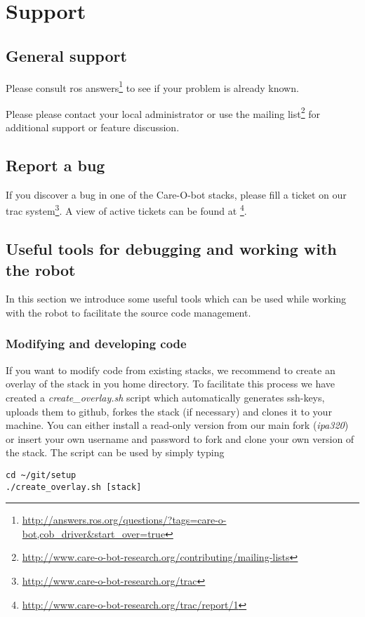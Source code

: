 \chapter{Support}\label{chap:support}
\section{General support}
Please consult ros answers\footnote{\url{http://answers.ros.org/questions/?tags=care-o-bot,cob_driver&start_over=true}} to see if your problem is already known. 

Please please contact your local administrator or use the mailing list\footnote{\url{http://www.care-o-bot-research.org/contributing/mailing-lists}} for additional support or feature discussion.

\section{Report a bug}
If you discover a bug in one of the Care-O-bot stacks, please fill a ticket on our trac system\footnote{\url{http://www.care-o-bot-research.org/trac}}. A view of active tickets can be found at \footnote{\url{http://www.care-o-bot-research.org/trac/report/1}}.


\section{Useful tools for debugging and working with the robot}
In this section we introduce some useful tools which can be used while working with the robot to facilitate the source code management.

\subsection{Modifying and developing code}
If you want to modify code from existing stacks, we recommend to create an overlay of the stack in you home directory. To facilitate this process we have created a \textit{create\_overlay.sh} script which automatically generates ssh-keys, uploads them to github, forkes the stack (if necessary) and clones it to your machine. You can either install a read-only version from our main fork (\textit{ipa320}) or insert your own username and password to fork and clone your own version of the stack. The script can be used by simply typing
\begin{lstlisting}
cd ~/git/setup
./create_overlay.sh [stack]
\end{lstlisting}

